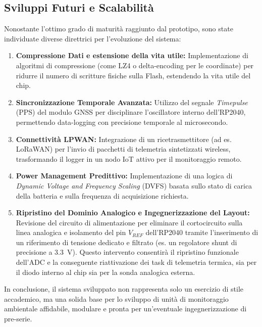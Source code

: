\subsection{Sviluppi Futuri e Scalabilità}

Nonostante l'ottimo grado di maturità raggiunto dal prototipo, sono state individuate diverse direttrici per l'evoluzione del sistema:

\begin{enumerate}
    \item \textbf{Compressione Dati e estensione della vita utile:} Implementazione di algoritmi di compressione (come LZ4 o delta-encoding per le coordinate) per ridurre il numero di scritture fisiche sulla Flash, estendendo la vita utile del chip.
    
    \item \textbf{Sincronizzazione Temporale Avanzata:} Utilizzo del segnale \textit{Timepulse} (PPS) del modulo GNSS per disciplinare l'oscillatore interno dell'RP2040, permettendo data-logging con precisione temporale al microsecondo.
    
    \item \textbf{Connettività LPWAN:} Integrazione di un ricetrasmettitore (ad es. LoRaWAN) per l'invio di pacchetti di telemetria sintetizzati wireless, trasformando il logger in un nodo IoT attivo per il monitoraggio remoto.
    
    \item \textbf{Power Management Predittivo:} Implementazione di una logica di \textit{Dynamic Voltage and Frequency Scaling} (DVFS) basata sullo stato di carica della batteria e sulla frequenza di acquisizione richiesta.
	
    \item \textbf{Ripristino del Dominio Analogico e Ingegnerizzazione del Layout:} Revisione del circuito di alimentazione per eliminare il cortocircuito sulla linea analogica e isolamento del pin $V_{REF}$ dell'RP2040 tramite l'inserimento di un riferimento di tensione dedicato e filtrato (es. un regolatore shunt di precisione a \qty{3.3}{V}). Questo intervento consentirà il ripristino funzionale dell'ADC e la conseguente riattivazione dei task di telemetria termica, sia per il diodo interno al chip sia per la sonda analogica esterna.
\end{enumerate}



\vspace{2em}
In conclusione, il sistema sviluppato non rappresenta solo un esercizio di stile accademico, ma una solida base per lo sviluppo di unità di monitoraggio ambientale affidabile, modulare e pronta per un'eventuale ingegnerizzazione di pre-serie.
